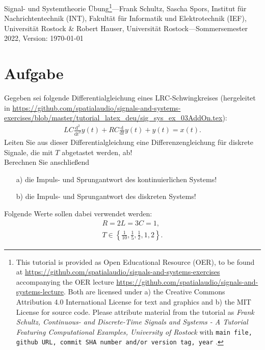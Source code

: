 \documentclass[11pt,a4paper,DIV=12]{scrartcl}
\begin{document}
	\noindent Signal- und Systemtheorie Übung\footnote{This tutorial is provided as
		Open Educational Resource (OER), to be found at
		\url{https://github.com/spatialaudio/signals-and-systems-exercises}
		accompanying the OER lecture
		\url{https://github.com/spatialaudio/signals-and-systems-lecture}.
		Both are licensed under a) the Creative Commons Attribution 4.0 International
		License for text and graphics and b) the MIT License for source code.
		Please attribute material from the tutorial as \textit{Frank Schultz,
			Continuous- and Discrete-Time Signals and Systems - A Tutorial Featuring
			Computational Examples, University of Rostock} with
		\texttt{main file, github URL, commit SHA number and/or version tag, year}
		.}---Frank Schultz, Sascha Spors,
	Institut für Nachrichtentechnik (INT),
	Fakultät für Informatik und Elektrotechnik (IEF),
	Universität Rostock \&
	Robert Hauser, Universität Rostock---Sommersemester 2022, Version: \today
	
\section{Aufgabe}
Gegeben sei folgende Differentialgleichung eines LRC-Schwingkreises (hergeleitet in \url{https://github.com/spatialaudio/signals-and-systems-exercises/blob/master/tutorial_latex_deu/sig_sys_ex_03AddOn.tex}):
\begin{gather}
	LC \frac{\mathrm{d} ^2}{\mathrm{d} t^2}y(t)+RC\frac{\mathrm{d}}{\mathrm{d} t}y(t)+y(t)=x(t).
\end{gather}
Leiten Sie aus dieser Differentialgleichung eine Differenzengleichung für diskrete Signale, die mit $T$ abgetastet werden, ab!\\
Berechnen Sie anschließend
\begin{itemize}
	\item[a) ] die Impuls- und Sprungantwort des kontinuierlichen Systems!
	\item[b) ] die Impuls- und Sprungantwort des diskreten Systems! 
\end{itemize}
Folgende Werte sollen dabei verwendet werden:
\begin{gather}
	R=2L=3C=1,\\
	T\in\left\{\frac{1}{10},\frac{1}{5},\frac{1}{2},1,2\right\}.
\end{gather}
\end{document}
